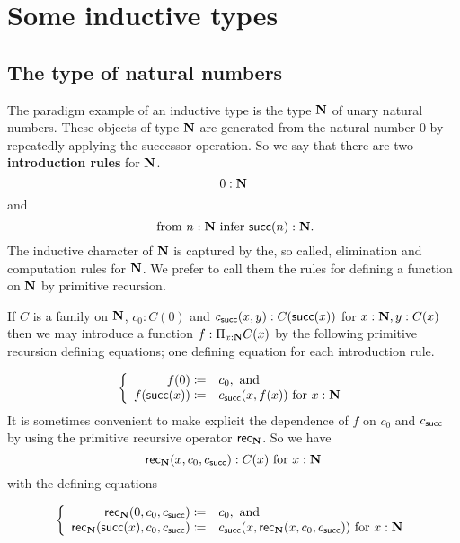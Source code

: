 {\begin{enumerate}
\end{enumerate}

\newpage

\section{Some inductive types}
\subsection{The type of natural numbers}
The paradigm example of an inductive type is the type ${\bf N}$ of unary natural numbers.  These objects of type ${\bf N}$ are generated from the natural number $0$ by repeatedly applying the successor operation.  So we say that there are two {\bf introduction rules} for ${\bf N}$. 
  \[ 0:{\bf N}\]
and
  \[ \mbox{ from $n:{\bf N}$ infer ${\sf succ}(n):{\bf N}$}.\]
The inductive character of ${\bf N}$ is captured by the, so called, elimination and computation rules for ${\bf N}$.  We prefer to call them the rules for defining a function on ${\bf N}$ by primitive recursion. 

If $C$ is a family on ${\bf N}$, $c_0:C(0)$ and $c_{\sf succ}(x,y):C({\sf succ}(x))$ for $x:{\bf N},y:C(x)$ then we may introduce a function $f:\Pi_{x:{\bf N}}C(x)$ by the following primitive recursion defining equations; one defining equation for each introduction rule.

  \[\left\{\begin{array}{rl}
f(0)\coloneqq& c_0, \mbox{ and}\\
f({\sf succ}(x))\coloneqq& c_{\sf succ}(x,f(x))\mbox{ for } x:{\bf N}
  \end{array}\right.\]
It is sometimes convenient to make explicit the dependence of $f$ on $c_0$ and $c_{\sf succ}$ by using the primitive recursive operator ${\sf rec}_{\bf N}$.  So we have
  \[ {\sf rec}_{\bf N}(x,c_0,c_{\sf succ}):C(x)\mbox{ for } x:{\bf N}\]
with the defining equations

  \[\left\{\begin{array}{rl}
{\sf rec}_{\bf N}(0,c_0,c_{\sf succ})\coloneqq& c_0, \mbox{ and }\\
{\sf rec}_{\bf N}({\sf succ}(x),c_0,c_{\sf succ})\coloneqq& c_{\sf succ}(x,{\sf rec}_{\bf N}(x,c_0,c_{\sf succ}))\mbox{ for } x:{\bf N}
  \end{array}\right.\]
}

